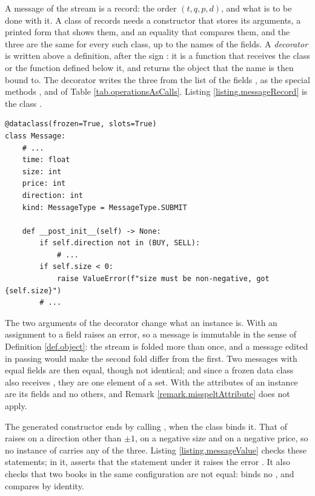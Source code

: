 A message of the stream is a record:
the order $(t, q, p, d)$, and what is to be done with it.
A class of records needs a constructor that stores its arguments,
a printed form that shows them,
and an equality that compares them,
and the three are the same for every such class, up to the names of the fields.
A \emph{decorator} is written above a definition, after the sign :
it is a function that receives the class or the function defined below it,
and returns the object that the name is then bound to.
The decorator  writes the three from the list of the fields
\citep[Chapter 5]{Ram22flu},
as the special methods ,  and 
of Table \ref{tab.operationsAsCalls}.
Listing \ref{listing.messageRecord} is the class .

\begin{lstlisting}[caption={\protect\codehl{unito26.lob.messages.Message}, abridged: the docstring and two of its three checks are cut.}, label=listing.messageRecord]
@dataclass(frozen=True, slots=True)
class Message:
    # ...
    time: float
    size: int
    price: int
    direction: int
    kind: MessageType = MessageType.SUBMIT

    def __post_init__(self) -> None:
        if self.direction not in (BUY, SELL):
            # ...
        if self.size < 0:
            raise ValueError(f"size must be non-negative, got {self.size}")
        # ...
\end{lstlisting}

The two arguments of the decorator change what an instance is.
With  an assignment to a field raises an error,
so a message is immutable in the sense of Definition \ref{def.object}:
the stream is folded more than once,
and a message edited in passing would make the second fold differ from the first.
Two messages with equal fields are then equal, though not identical;
and since a frozen data class also receives ,
they are one element of a set.
With  the attributes of an instance are its fields and no others,
and Remark \ref{remark.misspeltAttribute} does not apply.

The generated constructor ends by calling , when the class binds it.
That of  raises on a direction other than $\pm 1$,
on a negative size and on a negative price,
so no instance of  carries any of the three.
Listing \ref{listing.messageValue} checks these statements;
in it,  asserts that the statement under it raises the error .
It also checks that two books in the same configuration are not equal:
 binds no ,
and  compares by identity.

